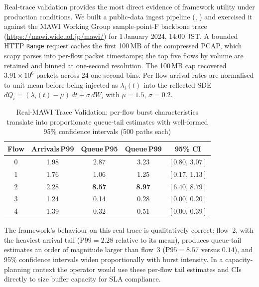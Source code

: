 \documentclass{ieeeaccess}
\begin{document}
Real-trace validation provides the most direct evidence of framework utility under production conditions.
We built a public-data ingest pipeline (,
) and exercised it against the MAWI Working Group
sample-point-F backbone trace (\url{https://mawi.wide.ad.jp/mawi/}) for 1\,January 2024,
14:00 JST. A bounded HTTP \texttt{Range} request caches the first 100\,MB of the compressed
PCAP, which scapy parses into per-flow packet timestamps; the top five flows by volume are
retained and binned at one-second resolution. The 100\,MB cap recovered $3.91\times10^{6}$
packets across 24 one-second bins. Per-flow arrival rates are normalised to unit mean before
being injected as $\lambda_i(t)$ into the reflected SDE
$dQ_i = (\lambda_i(t)-\mu)\,dt + \sigma\,dW_i$ with $\mu=1.5$, $\sigma=0.2$.

\begin{table}[!t]
\caption{Real-MAWI Trace Validation: per-flow burst characteristics translate into proportionate
queue-tail estimates with well-formed 95\% confidence intervals (500 paths each)}
\label{tab:mawi_validation}
\centering
\begin{tabular}{@{}c c c c c@{}}
\toprule
Flow & Arrivals\,P99 & Queue\,P95 & Queue\,P99 & 95\% CI \\
\midrule
0 & 1.98 & 2.87 & 3.23 & $[0.80,\,3.07]$ \\
1 & 1.76 & 1.06 & 1.25 & $[0.17,\,1.13]$ \\
2 & 2.28 & \textbf{8.57} & \textbf{8.97} & $[6.40,\,8.79]$ \\
3 & 1.24 & 0.14 & 0.28 & $[0.00,\,0.20]$ \\
4 & 1.39 & 0.32 & 0.51 & $[0.00,\,0.39]$ \\
\bottomrule
\end{tabular}
\end{table}

The framework's behaviour on this real trace is qualitatively correct: flow~2, with the heaviest
arrival tail ($\mathrm{P99}=2.28$ relative to its mean), produces queue-tail estimates an order
of magnitude larger than flow~3 ($\mathrm{P95}=8.57$ versus $0.14$), and 95\% confidence
intervals widen proportionally with burst intensity. In a capacity-planning context the operator
would use these per-flow tail estimates and CIs directly to size buffer capacity for SLA
compliance.
\end{document}

